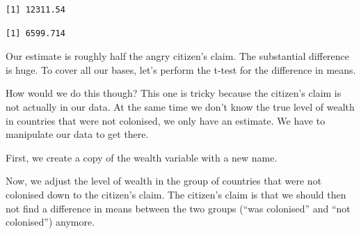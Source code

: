 \documentclass[]{article}
\newenvironment{Shaded}{\begin{snugshade}}{\end{snugshade}}
\newcommand{\KeywordTok}[1]{\textcolor[rgb]{0.13,0.29,0.53}{\textbf{#1}}}
\newcommand{\FloatTok}[1]{\textcolor[rgb]{0.00,0.00,0.81}{#1}}
\newcommand{\StringTok}[1]{\textcolor[rgb]{0.31,0.60,0.02}{#1}}
\newcommand{\CommentTok}[1]{\textcolor[rgb]{0.56,0.35,0.01}{\textit{#1}}}
\newcommand{\OperatorTok}[1]{\textcolor[rgb]{0.81,0.36,0.00}{\textbf{#1}}}
\newcommand{\NormalTok}[1]{#1}
\theoremstyle{definition}
\theoremstyle{definition}
\theoremstyle{definition}
\theoremstyle{remark}
\begin{document}
\begin{verbatim}
[1] 12311.54
\end{verbatim}

\begin{Shaded}
\end{Shaded}

\begin{verbatim}
[1] 6599.714
\end{verbatim}

Our estimate is roughly half the angry citizen's claim. The substantial
difference is huge. To cover all our bases, let's perform the t-test for
the difference in means.

How would we do this though? This one is tricky because the citizen's
claim is not actually in our data. At the same time we don't know the
true level of wealth in countries that were not colonised, we only have
an estimate. We have to manipulate our data to get there.

First, we create a copy of the wealth variable with a new name.

\begin{Shaded}
\end{Shaded}

Now, we adjust the level of wealth in the group of countries that were
not colonised down to the citizen's claim. The citizen's claim is that
we should then not find a difference in means between the two groups
(``was colonised'' and ``not colonised'') anymore.

\begin{Shaded}
\end{Shaded}
\end{document}
